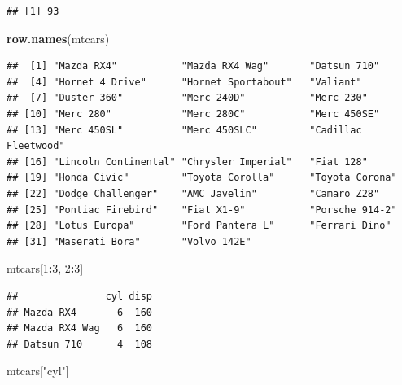 \documentclass[]{article}
\newenvironment{Shaded}{\begin{snugshade}}{\end{snugshade}}
\newcommand{\KeywordTok}[1]{\textcolor[rgb]{0.13,0.29,0.53}{\textbf{#1}}}
\newcommand{\DecValTok}[1]{\textcolor[rgb]{0.00,0.00,0.81}{#1}}
\newcommand{\StringTok}[1]{\textcolor[rgb]{0.31,0.60,0.02}{#1}}
\newcommand{\OperatorTok}[1]{\textcolor[rgb]{0.81,0.36,0.00}{\textbf{#1}}}
\newcommand{\NormalTok}[1]{#1}
\begin{document}
\begin{verbatim}
## [1] 93
\end{verbatim}

\begin{Shaded}
\begin{Highlighting}[]
\KeywordTok{row.names}\NormalTok{(mtcars)}
\end{Highlighting}
\end{Shaded}

\begin{verbatim}
##  [1] "Mazda RX4"           "Mazda RX4 Wag"       "Datsun 710"         
##  [4] "Hornet 4 Drive"      "Hornet Sportabout"   "Valiant"            
##  [7] "Duster 360"          "Merc 240D"           "Merc 230"           
## [10] "Merc 280"            "Merc 280C"           "Merc 450SE"         
## [13] "Merc 450SL"          "Merc 450SLC"         "Cadillac Fleetwood" 
## [16] "Lincoln Continental" "Chrysler Imperial"   "Fiat 128"           
## [19] "Honda Civic"         "Toyota Corolla"      "Toyota Corona"      
## [22] "Dodge Challenger"    "AMC Javelin"         "Camaro Z28"         
## [25] "Pontiac Firebird"    "Fiat X1-9"           "Porsche 914-2"      
## [28] "Lotus Europa"        "Ford Pantera L"      "Ferrari Dino"       
## [31] "Maserati Bora"       "Volvo 142E"
\end{verbatim}

\begin{Shaded}
\begin{Highlighting}[]
\NormalTok{mtcars[}\DecValTok{1}\OperatorTok{:}\DecValTok{3}\NormalTok{, }\DecValTok{2}\OperatorTok{:}\DecValTok{3}\NormalTok{]}
\end{Highlighting}
\end{Shaded}

\begin{verbatim}
##               cyl disp
## Mazda RX4       6  160
## Mazda RX4 Wag   6  160
## Datsun 710      4  108
\end{verbatim}

\begin{Shaded}
\begin{Highlighting}[]
\NormalTok{mtcars[}\StringTok{"cyl"}\NormalTok{]}
\end{Highlighting}
\end{Shaded}
\end{document}

